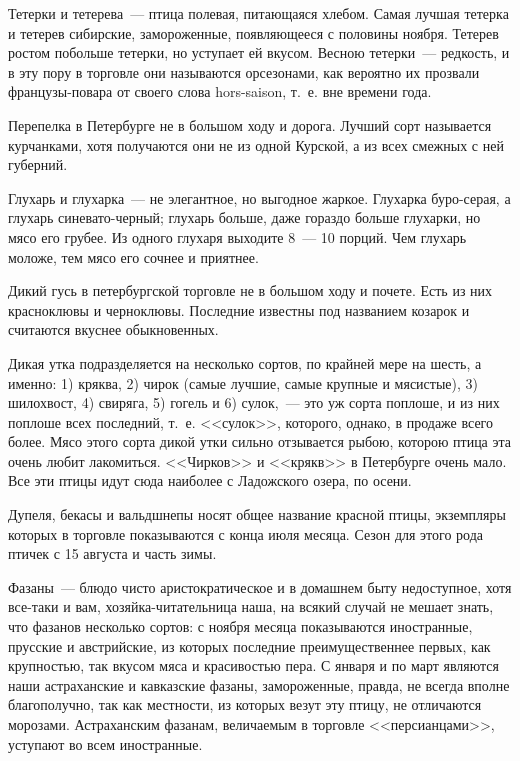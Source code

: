 Тетерки и тетерева~--- птица полевая, питающаяся хлебом. Самая лучшая тетерка и тетерев сибирские, замороженные, появляющееся с половины ноября. Тетерев ростом побольше тетерки, но уступает ей вкусом. Весною тетерки~--- редкость, и в эту пору в торговле они называются орсезонами, как вероятно их прозвали французы-повара от своего слова hors-saison, т.~е. вне времени года.

Перепелка в Петербурге не в большом ходу и дорога. Лучший сорт называется курчанками, хотя получаются они не из одной Курской, а из всех смежных с ней губерний.

Глухарь и глухарка~--- не элегантное, но выгодное жаркое. Глухарка буро-серая, а глухарь синевато-черный; глухарь больше, даже гораздо больше глухарки, но мясо его грубее. Из одного глухаря выходите 8~--- 10 порций. Чем глухарь моложе, тем мясо его сочнее и приятнее.

Дикий гусь в петербургской торговле не в большом ходу и почете. Есть из них красноклювы и черноклювы. Последние известны под названием козарок и считаются вкуснее обыкновенных.

Дикая утка подразделяется на несколько сортов, по крайней мере на шесть, а именно: 1) кряква, 2) чирок (самые лучшие, самые крупные и мясистые), 3) шилохвост, 4) свиряга, 5) гогель и 6) сулок,~--- это уж сорта поплоше, и из них поплоше всех последний, т.~е. <<сулок>>, которого, однако, в продаже всего более. Мясо этого сорта дикой утки сильно отзывается рыбою, которою птица эта очень любит лакомиться. <<Чирков>> и <<крякв>> в Петербурге очень мало. Все эти птицы идут сюда наиболее с Ладожского озера, по осени.

Дупеля, бекасы и вальдшнепы носят общее название красной птицы, экземпляры которых в торговле показываются с конца июля месяца. Сезон для этого рода птичек с 15 августа и часть зимы.

Фазаны~--- блюдо чисто аристократическое и в домашнем быту недоступное, хотя все-таки и вам, хозяйка-читательница наша, на всякий случай не мешает знать, что фазанов несколько сортов: с ноября месяца показываются иностранные, прусские и австрийские, из которых последние преимущественнее первых, как крупностью, так вкусом мяса и красивостью пера. С января и по март являются наши астраханские и кавказские фазаны, замороженные, правда, не всегда вполне благополучно, так как местности, из которых везут эту птицу, не отличаются морозами. Астраханским фазанам, величаемым в торговле <<персианцами>>, уступают во всем иностранные.

